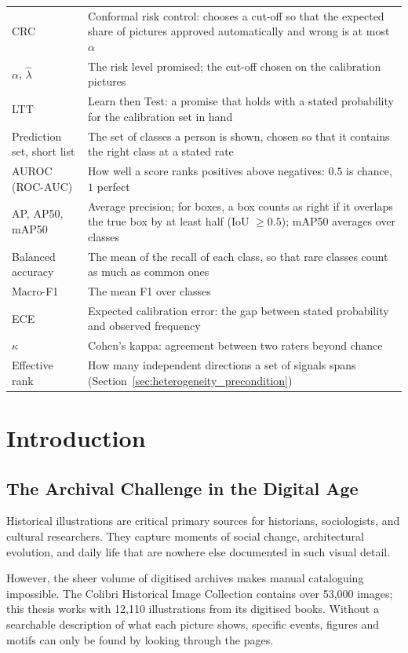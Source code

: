 \documentclass[12pt,a4paper]{report}
\begin{document}
\begin{singlespace}
\begin{small}
\begin{longtable}{@{}p{3.3cm}p{11.2cm}@{}}
CRC & Conformal risk control: chooses a cut-off so that the expected share of pictures approved automatically and wrong is at most $\alpha$ \\
$\alpha$, $\hat\lambda$ & The risk level promised; the cut-off chosen on the calibration pictures \\
LTT & Learn then Test: a promise that holds with a stated probability for the calibration set in hand \\
Prediction set, short list & The set of classes a person is shown, chosen so that it contains the right class at a stated rate \\
AUROC (ROC-AUC) & How well a score ranks positives above negatives: $0.5$ is chance, $1$ perfect \\
AP, AP50, mAP50 & Average precision; for boxes, a box counts as right if it overlaps the true box by at least half (IoU $\ge 0.5$); mAP50 averages over classes \\
Balanced accuracy & The mean of the recall of each class, so that rare classes count as much as common ones \\
Macro-F1 & The mean F1 over classes \\
ECE & Expected calibration error: the gap between stated probability and observed frequency \\
$\kappa$ & Cohen's kappa: agreement between two raters beyond chance \\
Effective rank & How many independent directions a set of signals spans (Section~\ref{sec:heterogeneity_precondition}) \\
\bottomrule
\end{longtable}
\end{small}
\end{singlespace}

\cleardoublepage
{}
\chapter{Introduction}
\label{sec:intro}
\section{The Archival Challenge in the Digital Age}
Historical illustrations are critical primary sources for historians, sociologists, 
and cultural researchers. They capture moments of social change, architectural 
evolution, and daily life that are nowhere else documented in such visual detail. 

However, the sheer volume of digitised archives makes manual cataloguing impossible.
 The Colibri Historical Image Collection contains over 53,000 images; this thesis works with 12,110 illustrations from its digitised books. Without a searchable description of what each picture shows, specific events, figures and motifs can only be found by looking through the pages.
\end{document}
